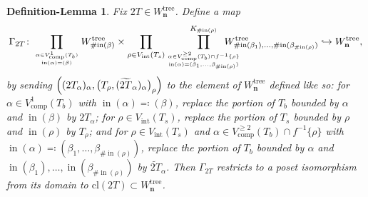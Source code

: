 \documentclass[11pt]{amsart}
\newtheorem{deflem}[theorem]{Definition-Lemma}
\theoremstyle{definition}
\theoremstyle{remark}
\theoremstyle{plain}
\newcommand\bn{\mathbf{n}}
\newcommand{\on}{\operatorname}
\newcommand{\comp}{C^2}
\renewcommand{\comp}{{\on{comp}}}
\newcommand{\incom}{\on{in}}
\newcommand{\inte}{{\on{int}}}
\newcommand{\tree}{{\on{tree}}}
\newcommand{\cl}{\mathrm{cl}}
\newcommand{\wt}{\widetilde}
\def\hra{\hookrightarrow}
\begin{document}
\begin{deflem}
\label{deflem:Gamma2T}
Fix $2T \in W_\bn^\tree$.
Define a map
\begin{align}
\Gamma_{2T} \colon \prod_{
{\alpha \in V_\comp^1(T_b)}
\atop
{\incom(\alpha)=(\beta)}
} W_{\#\!\incom(\beta)}^\tree
\times
\prod_{\rho \in V_\inte(T_s)} \prod^{K_{\#\!\incom(\rho)}}_{
{\alpha\in V_\comp^{\geq2}(T_b)\cap f^{-1}\{\rho\}}
\atop
{\incom(\alpha)=(\beta_1,\ldots,\beta_{\#\!\incom(\rho)})}
}
\hspace{-0.25in} W^\tree_{\#\!\incom(\beta_1),\ldots,\#\!\incom(\beta_{\#\!\incom(\rho)})}
\hra W_\bn^\tree,
\end{align}
by sending $\Bigl((2T_\alpha)_\alpha,\bigl(T_\rho,(\wt{2T}_\alpha)_\alpha\bigr)_\rho\Bigr)$ to the element of $W_\bn^\tree$ defined like so: for $\alpha \in V^1_\comp(T_b)$ with $\incom(\alpha)\eqqcolon(\beta)$, replace the portion of $T_b$ bounded by $\alpha$ and $\incom(\beta)$ by $2T_\alpha$; for $\rho \in V_\inte(T_s)$, replace the portion of $T_s$ bounded by $\rho$ and $\incom(\rho)$ by $T_\rho$; and for $\rho \in V_\inte(T_s)$ and $\alpha \in V^{\geq2}_\comp(T_b)\cap f^{-1}\{\rho\}$ with $\incom(\alpha)\eqqcolon(\beta_1,\ldots,\beta_{\#\!\incom(\rho)})$, replace the portion of $T_b$ bounded by $\alpha$ and $\incom(\beta_1),\ldots,\incom(\beta_{\#\!\incom(\rho)})$ by $\wt{2T}_\alpha$.
Then $\Gamma_{2T}$ restricts to a poset isomorphism from its domain to $\cl(2T) \subset W_\bn^\tree$.
\end{deflem}
\end{document}
